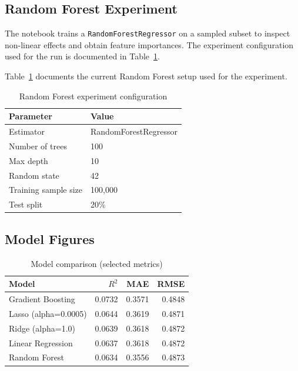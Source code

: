 \documentclass[11pt]{article}
\begin{document}
\subsection{Random Forest Experiment}
The notebook trains a \texttt{RandomForestRegressor} on a sampled subset to inspect non-linear effects and obtain feature importances. The experiment configuration used for the run is documented in Table~\ref{tab:rf_setup}.

Table~\ref{tab:rf_setup} documents the current Random Forest setup used for the experiment.

\begin{table}[H]
    \centering
    \caption{Random Forest experiment configuration}
    \label{tab:rf_setup}
    \begin{tabular}{ll}
        \toprule
        Parameter            & Value                 \\
        \midrule
        Estimator            & RandomForestRegressor \\
        Number of trees      & 100                   \\
        Max depth            & 10                    \\
        Random state         & 42                    \\
        Training sample size & 100{,}000             \\
        Test split           & 20\%                  \\
        \bottomrule
    \end{tabular}
\end{table}

\subsection{Model Figures}

\begin{table}[H]
    \centering
    \caption{Model comparison (selected metrics)}
    \label{tab:model_comparison}
    \begin{tabular}{lrrr}
        \toprule
        Model                & $R^2$  & MAE    & RMSE   \\
        \midrule
        Gradient Boosting    & 0.0732 & 0.3571 & 0.4848 \\
        Lasso (alpha=0.0005) & 0.0644 & 0.3619 & 0.4871 \\
        Ridge (alpha=1.0)    & 0.0639 & 0.3618 & 0.4872 \\
        Linear Regression    & 0.0637 & 0.3618 & 0.4872 \\
        Random Forest        & 0.0634 & 0.3556 & 0.4873 \\
        \bottomrule
    \end{tabular}
    \\
    \vspace{2mm}
\end{table}
\end{document}
